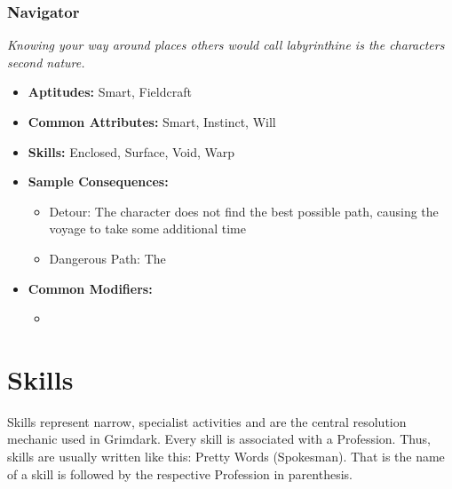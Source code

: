 \subsubsection{Navigator}\label{Navigator}
\textit{Knowing your way around places others would call labyrinthine is the characters second nature.}
\begin{itemize}
	\item \textbf{Aptitudes:} Smart, Fieldcraft
	\item \textbf{Common Attributes:} Smart, Instinct, Will
	\item \textbf{Skills:} Enclosed, Surface, Void, Warp
	\item \textbf{Sample Consequences:} 
	\begin{itemize}
		\item Detour: The character does not find the best possible path, causing the voyage to take some additional time
		\item Dangerous Path: The 
	\end{itemize}
	\item \textbf{Common Modifiers:}
	\begin{itemize}
		\item 
	\end{itemize}
\end{itemize}


\section{Skills}%
\label{sec:skills}
Skills represent narrow, specialist activities and are the central resolution mechanic used in Grimdark. 
Every skill is associated with a Profession.
Thus, skills are usually written like this: Pretty Words (Spokesman).
That is the name of a skill is followed by the respective Profession in parenthesis.

